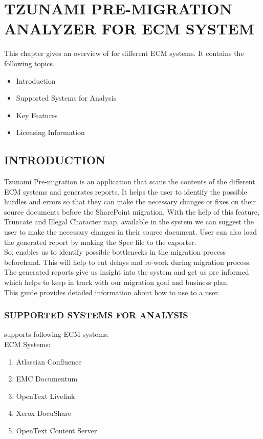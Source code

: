 \chapter{TZUNAMI PRE-MIGRATION ANALYZER FOR ECM SYSTEM}
This chapter gives an overview of \appName for different ECM systems. It contains the following topics.
\begin{itemize}
  \item Introduction
  \item Supported Systems for Analysis
  \item Key Features
  \item Licensing Information
\end{itemize}
 \section{INTRODUCTION}
 Tzunami Pre-migration is an application that scans the contents of the different ECM systems and generates reports. It helps the user to identify the possible hurdles and errors so that they can make the necessary changes or fixes on their source documents before the SharePoint migration. With the help of this feature, Truncate and Illegal Character map, available in the system we can suggest the user to make the necessary changes in their source document. User can also load the generated report by making the Spec file to the exporter.
 \\
So, \appName enables us to identify possible bottlenecks in the migration process beforehand. This will help to cut delays and re-work during migration process. The generated reports give us insight into the system and get us pre informed which helps to keep in track with our migration goal and business plan.
 \\
This guide provides detailed information about how to use \appName to a user.
\subsection{SUPPORTED SYSTEMS FOR ANALYSIS}
\appName supports following ECM systems:
 \\
ECM Systems:
 \\
\begin{enumerate}
  \item Atlassian Confluence
  \item EMC Documentum
  \item OpenText Livelink
  \item Xerox DocuShare
  \item OpenText Content Server
\end{enumerate}
